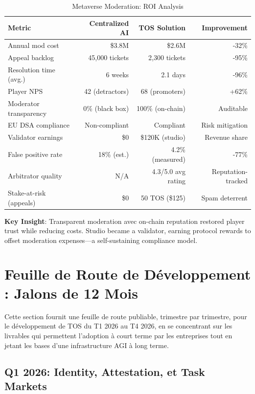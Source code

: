 \documentclass[11pt]{article}
\begin{document}
\begin{table}[H]
\centering
\caption{Metaverse Moderation: ROI Analysis}
\label{tab:metaverse-roi}
\begin{tabular}{@{}lrrr@{}}
\toprule
\textbf{Metric} & \textbf{Centralized AI} & \textbf{TOS Solution} & \textbf{Improvement} \\ \midrule
Annual mod cost & \$3.8M & \$2.6M & -32\% \\
Appeal backlog & 45,000 tickets & 2,300 tickets & -95\% \\
Resolution time (avg.) & 6 weeks & 2.1 days & -96\% \\
Player NPS & 42 (detractors) & 68 (promoters) & +62\% \\
Moderator transparency & 0\% (black box) & 100\% (on-chain) & Auditable \\
EU DSA compliance & Non-compliant & Compliant & Risk mitigation \\
Validator earnings & \$0 & \$120K (studio) & Revenue share \\
False positive rate & 18\% (est.) & 4.2\% (measured) & -77\% \\
Arbitrator quality & N/A & 4.3/5.0 avg rating & Reputation-tracked \\
Stake-at-risk (appeals) & \$0 & 50 TOS (\$125) & Spam deterrent \\
\bottomrule
\end{tabular}
\end{table}

\textbf{Key Insight}: Transparent moderation avec on-chain reputation restored player trust while reducing costs. Studio became a validator, earning protocol rewards to offset moderation expenses—a self-sustaining compliance model.

\section{Feuille de Route de Développement : Jalons de 12 Mois}
\label{sec:12month-roadmap}

Cette section fournit une feuille de route publiable, trimestre par trimestre, pour le développement de TOS du T1 2026 au T4 2026, en se concentrant sur les livrables qui permettent l'adoption à court terme par les entreprises tout en jetant les bases d'une infrastructure AGI à long terme.

\subsection{Q1 2026: Identity, Attestation, et Task Markets}
\end{document}
